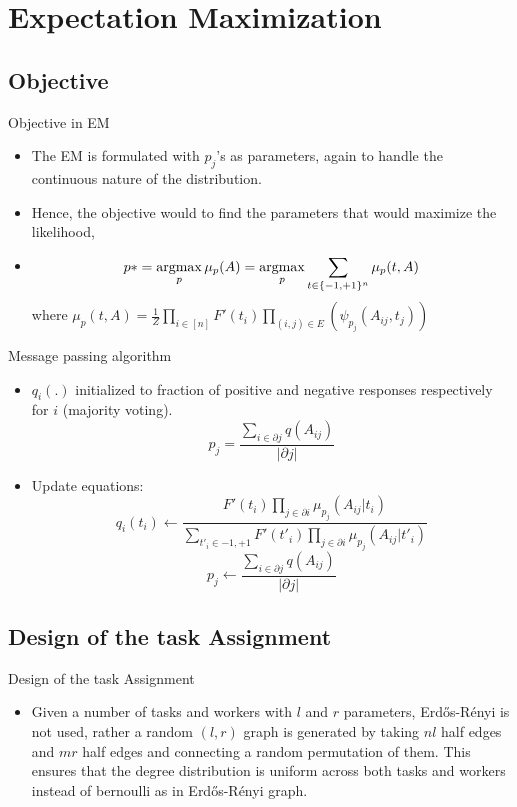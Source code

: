 \documentclass{beamer}
\newcommand*{\argmax}{\operatornamewithlimits{argmax}\limits}
\begin{document}
\section{Expectation Maximization}
\subsection{Objective}

\begin{frame}{Objective in EM}
    \begin{itemize}
    \item {
    The EM is formulated with $p_j$'s as parameters, again to handle the continuous nature of the distribution.
    }
    \item {
    Hence, the objective would to find the parameters that would maximize the likelihood,
    }
    \item {
    $$p* = \argmax_p\mu_p(A) = \argmax_p\sum_{t\in\{-1,+1\}^n}\mu_p(t,A)$$
    where $\mu_p(t,A) = \frac{1}{Z}\prod_{i\in [n]}{F'(t_i)}\prod_{(i,j)\in E}(\psi_{p_j}(A_{ij},t_j))$
    }
    \end{itemize}
\end{frame}

\begin{frame}{Message passing algorithm}
  \begin{itemize}
  \item {
  $q_i(.)$ initialized to fraction of positive and negative responses respectively for $i$ (majority voting).
  $$p_j = \frac{\sum_{i\in \partial j}q(A_{ij})}{|\partial j|}$$
  }
  \item {
  Update equations:
  $$q_i(t_i) \leftarrow \frac{F'(t_i)\prod_{j\in \partial i} \mu_{p_j}(A_{ij}|t_i)}{\sum_{t'_i\in {-1,+1}}F'(t'_i)\prod_{j\in \partial i} \mu_{p_j}(A_{ij}|t'_i)}$$
  $$p_j \leftarrow \frac{\sum_{i\in \partial j}q(A_{ij})}{|\partial j|}$$
  }
  \end{itemize}
\end{frame}



\subsection{Design of the task Assignment}

\begin{frame}{Design of the task Assignment}
    \begin{itemize}
    \item {
    Given a number of tasks and workers with $l$ and $r$ parameters, Erd\H{o}s-R\'enyi is not used, rather a random $(l, r)$ graph is generated by taking $nl$ half edges and $mr$ half edges and connecting a random permutation of them. This ensures that the degree distribution is uniform  across both tasks and workers instead of bernoulli as in Erd\H{o}s-R\'enyi graph.
    }
    \end{itemize}
\end{frame}
\end{document}
